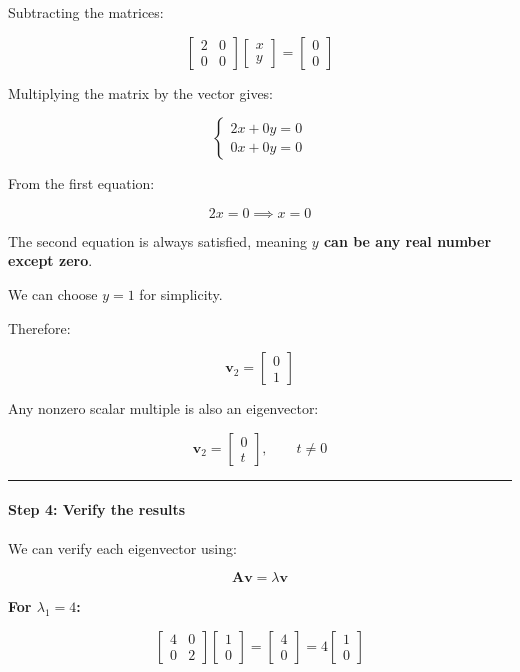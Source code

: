 \documentclass[11pt]{article}
\begin{document}
Subtracting the matrices:

\[
\begin{bmatrix}
2 & 0 \\
0 & 0
\end{bmatrix}
\begin{bmatrix}
x \\
y
\end{bmatrix}
=
\begin{bmatrix}
0 \\
0
\end{bmatrix}
\]

Multiplying the matrix by the vector gives:

\[
\begin{cases}
2x + 0y = 0 \\
0x + 0y = 0
\end{cases}
\]

From the first equation:

\[
2x = 0 \implies x = 0
\]

The second equation is always satisfied, meaning \textbf{\(y\) can be
any real number except zero}.

We can choose \(y = 1\) for simplicity.

Therefore:

\[
\boxed{
\mathbf{v}_2 =
\begin{bmatrix}
0 \\
1
\end{bmatrix}
}
\]

Any nonzero scalar multiple is also an eigenvector:

\[
\mathbf{v}_2 =
\begin{bmatrix}
0 \\
t
\end{bmatrix},
\qquad t \neq 0
\]

\begin{center}\rule{0.5\linewidth}{0.5pt}\end{center}

\paragraph{Step 4: Verify the results}\label{step-4-verify-the-results}

We can verify each eigenvector using:

\[
\mathbf{A}\mathbf{v} = \lambda\mathbf{v}
\]

\textbf{For \(\lambda_1 = 4\):}

\[
\begin{bmatrix}
4 & 0 \\
0 & 2
\end{bmatrix}
\begin{bmatrix}
1 \\
0
\end{bmatrix}
=
\begin{bmatrix}
4 \\
0
\end{bmatrix}
=
4
\begin{bmatrix}
1 \\
0
\end{bmatrix}
\]
\end{document}
